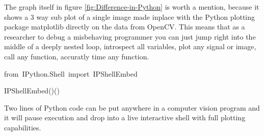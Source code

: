 \documentclass[english]{IEEEtran}
\theoremstyle{plain}
\newenvironment{lyxcode}
{\par\begin{list}{}{
\setlength{\rightmargin}{\leftmargin}
\setlength{\listparindent}{0pt}%
\raggedright
\setlength{\itemsep}{0pt}
\setlength{\parsep}{0pt}
\normalfont\ttfamily}%
 \item[]}
{\end{list}}
\begin{document}
The graph itself in figure \ref{fig:Difference-in-Python} is worth
a mention, because it shows a 3 way sub plot of a single image made
inplace with the Python plotting package matplotlib directly on the
data from OpenCV. This means that as a researcher to debug a misbehaving
programmer you can just jump right into the middle of a deeply nested
loop, introspect all variables, plot any signal or image, call any
function, accuratly time any function.

%
\begin{algorithm}[H]
\begin{lyxcode}
from~IPython.Shell~import~IPShellEmbed~

IPShellEmbed()()
\end{lyxcode}
\caption{\label{alg:drop-to-shell}Two lines of Python code can be put anywhere
in a computer vision program and it will pause execution and drop
into a live interactive shell with full plotting capabilities.}



\end{algorithm}
\end{document}
